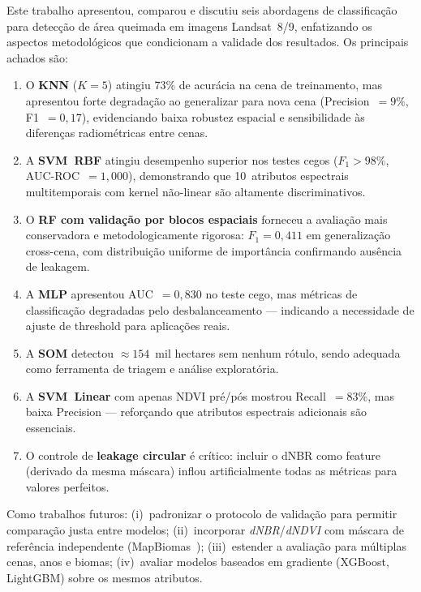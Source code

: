 \documentclass[conference]{IEEEtran}
\begin{document}
Este trabalho apresentou, comparou e discutiu seis abordagens de
classificação para detecção de área queimada em imagens Landsat~8/9,
enfatizando os aspectos metodológicos que condicionam a validade dos
resultados. Os principais achados são:

\begin{enumerate}
  \item O \textbf{KNN} ($K=5$) atingiu 73\% de acurácia na cena de
        treinamento, mas apresentou forte degradação ao generalizar para
        nova cena (Precision~$= 9\%$, F1~$= 0{,}17$), evidenciando baixa
        robustez espacial e sensibilidade às diferenças radiométricas
        entre cenas.
  \item A \textbf{SVM~RBF} atingiu desempenho superior nos testes cegos
        ($F_1 > 98\%$, AUC-ROC~$= 1{,}000$), demonstrando que 10~atributos
        espectrais multitemporais com kernel não-linear são altamente
        discriminativos.
  \item O \textbf{RF com validação por blocos espaciais} forneceu a
        avaliação mais conservadora e metodologicamente rigorosa:
        $F_1 = 0{,}411$ em generalização cross-cena, com distribuição
        uniforme de importância confirmando ausência de leakagem.
  \item A \textbf{MLP} apresentou AUC~$= 0{,}830$ no teste cego, mas
        métricas de classificação degradadas pelo desbalanceamento —
        indicando a necessidade de ajuste de threshold para aplicações reais.
  \item A \textbf{SOM} detectou $\approx154$~mil hectares sem nenhum
        rótulo, sendo adequada como ferramenta de triagem e análise
        exploratória.
  \item A \textbf{SVM~Linear} com apenas NDVI pré/pós mostrou Recall~$= 83\%$,
        mas baixa Precision — reforçando que atributos espectrais adicionais
        são essenciais.
  \item O controle de \textbf{leakage circular} é crítico: incluir o dNBR
        como feature (derivado da mesma máscara) inflou artificialmente todas
        as métricas para valores perfeitos.
\end{enumerate}

Como trabalhos futuros: (i)~padronizar o protocolo de validação para
permitir comparação justa entre modelos; (ii)~incorporar
\textit{dNBR}/\textit{dNDVI} com máscara de referência independente
(MapBiomas~\cite{b6}); (iii)~estender a avaliação para múltiplas cenas,
anos e biomas; (iv)~avaliar modelos baseados em gradiente (XGBoost,
LightGBM) sobre os mesmos atributos.
\end{document}
